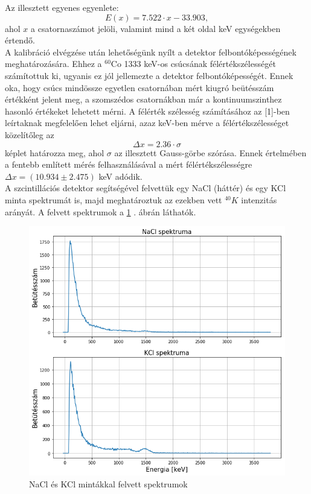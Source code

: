 \documentclass[12pt,a4paper]{article}
\begin{document}
Az illesztett egyenes egyenlete:
$$ E(x) = 7.522 \cdot x - 33.903 ,$$
ahol $x$ a csatornaszámot jelöli, valamint mind a két oldal keV egységekben értendő.\\
\hspace*{10pt} A kalibráció elvégzése után lehetőségünk nyílt a detektor felbontóképességének meghatározására. Ehhez a $^{60}$Co 1333 keV-os csúcsának félértékszélességét számítottuk ki, ugyanis ez jól jellemezte a detektor felbontóképességét. Ennek oka, hogy csúcs mindössze egyetlen csatornában mért kiugró beütésszám értékként jelent meg, a szomszédos csatornákban már a kontinuumszinthez hasonló értékeket lehetett mérni. A félérték szélesség számításához az [1]-ben leírtaknak megfelelően lehet eljárni, azaz keV-ben mérve a félértékszélességet közelítőleg az 
$$ \Delta x = 2.36 \cdot \sigma $$
képlet határozza meg, ahol $\sigma$ az illesztett Gauss-görbe szórása. Ennek értelmében a fentebb említett mérés felhasználásával a mért félértékszélességre $ \Delta x = (10.934 \pm 2.475)$ keV adódik.\\
\newpage
A szcintillációs detektor segítségével felvettük egy NaCl (háttér) és egy KCl minta spektrumát is, majd meghatároztuk az ezekben vett $^{40}K$ intenzitás arányát. A felvett spektrumok a \ref{fig:5} . ábrán láthatók.
\begin{figure}[!h]
\centering
\includegraphics[scale=0.60]{Na-K_spek}
\caption{NaCl és KCl mintákkal felvett spektrumok}
\label{fig:5}
\end{figure}
\end{document}
